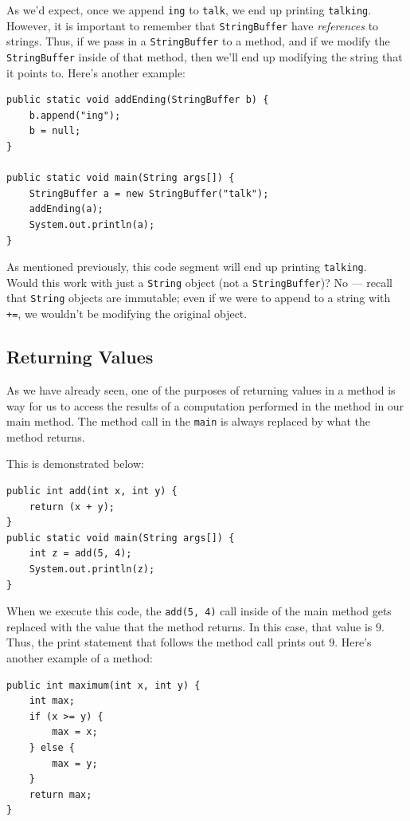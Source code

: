 As we'd expect, once we append \verb!ing! to \verb!talk!, we end up printing \verb!talking!. \\


However, it is important to remember that \verb!StringBuffer! have \textit{references} to strings. Thus, if we pass in a \verb!StringBuffer! to a method, and if we modify the \verb!StringBuffer! inside of that method, then we'll end up modifying the string that it points to. Here's another example:


\begin{lstlisting}
public static void addEnding(StringBuffer b) {
    b.append("ing");
    b = null;
}

public static void main(String args[]) {
    StringBuffer a = new StringBuffer("talk");
    addEnding(a);
    System.out.println(a);
}
\end{lstlisting}

As mentioned previously, this code segment will end up printing \verb!talking!. \\
 
Would this work with just a \verb!String! object (not a \verb!StringBuffer!)? No --- recall that \verb!String! objects are immutable; even if we were to append to a string with \verb!+=!, we wouldn't be modifying the original object.


\subsection{Returning Values}

As we have already seen, one of the purposes of returning values in a method is way for us to access the results of a computation performed in the method in our main method. The method call in the \verb!main! is always replaced by what the method returns. 

This is demonstrated below:

\begin{lstlisting}
public int add(int x, int y) {
    return (x + y);
}
public static void main(String args[]) {
    int z = add(5, 4);
    System.out.println(z);
}
\end{lstlisting}

When we execute this code, the \verb!add(5, 4)! call inside of the main method gets replaced with the value that the method returns. In this case, that value is $9$. Thus, the print statement that follows the method call prints out $9$. 
Here's another example of a method:

\begin{lstlisting}
public int maximum(int x, int y) {
    int max;
    if (x >= y) {
        max = x;
    } else {
        max = y;
    }
    return max;
}
\end{lstlisting}


